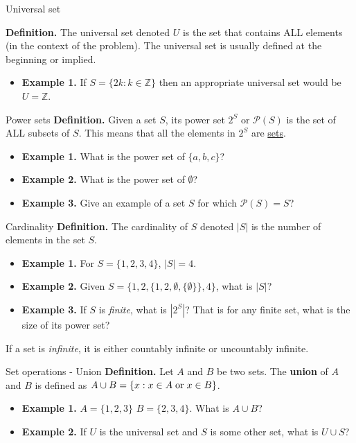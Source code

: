 \documentclass[10pt]{beamer}
\begin{document}
\begin{frame}{Universal set}

    \textbf{Definition.} The universal set denoted $U$ is the set that contains ALL elements (in the context of the problem). The universal set is usually defined at the beginning or implied.
    \begin{itemize}
        \item \textbf{Example 1.} If $S=\{2k:k\in \mathbb{Z}\}$ then an appropriate universal set would be $U=\mathbb{Z}$.
    \end{itemize}

\end{frame}

\begin{frame}{Power sets}
    \textbf{Definition.} Given a set $S$, its power set $2^S$ or $\mathcal{P}(S)$ is the set of ALL subsets of $S$. This means that all the elements in $2^S$ are \underline{sets}.
    \begin{itemize}
        \item \textbf{Example 1.} What is the power set of $\{a,b,c\}$?
        \item \textbf{Example 2.} What is the power set of $\emptyset$?
        \item \textbf{Example 3.} Give an example of a set $S$ for which $\mathcal{P}(S) = S$?
    \end{itemize}
\end{frame}

\begin{frame}{Cardinality}
    \textbf{Definition.} The cardinality of $S$ denoted $|S|$ is the number of elements in the set $S$.
    \begin{itemize}
        \item \textbf{Example 1.} For $S = \{1,2,3,4\}$, $|S| = 4$.
        \item \textbf{Example 2.} Given $S = \{1,2,\{1,2,\emptyset,\{\emptyset\}\},4 \}$, what is $|S|$?
        \item \textbf{Example 3.} If $S$ is \textit{finite}, what is $|2^S|$? That is for any finite set, what is the size of its power set?
    \end{itemize}
    If a set is \textit{infinite}, it is either countably infinite or uncountably infinite.
\end{frame}

\begin{frame}{Set operations - Union}
    \textbf{Definition.} Let $A$ and $B$ be two sets. The \textbf{union} of $A$ and $B$ is defined as $A \cup B = \{x:x \in A \text{\hspace{1mm}or\hspace{1mm}} x \in B \}$.
    \begin{itemize}
        \item \textbf{Example 1.} $A=\{1,2,3\}$ $B=\{2,3,4\}$. What is $A \cup B$?
        \item \textbf{Example 2.} If $U$ is the universal set and $S$ is some other set, what is $U \cup S$?
    \end{itemize}
\end{frame}
\end{document}

